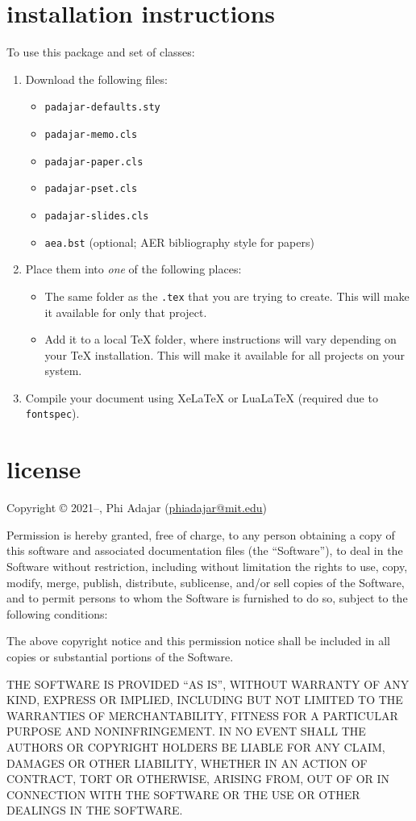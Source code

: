 \documentclass[11pt]{padajar-memo}
\begin{document}
\section{installation instructions}

To use this package and set of classes:

\begin{enumerate}
	\item Download the following files:
	\begin{itemize}
		\item \texttt{padajar-defaults.sty}
		\item \texttt{padajar-memo.cls}
		\item \texttt{padajar-paper.cls}
		\item \texttt{padajar-pset.cls}
		\item \texttt{padajar-slides.cls}
		\item \texttt{aea.bst} (optional; AER bibliography style for papers)
	\end{itemize}
	\item Place them into \textit{one} of the following places:
	\begin{itemize}
		\item The same folder as the \texttt{.tex} that you are trying to create. This will make it available for only that project.
		\item Add it to a local \TeX{} folder, where instructions will vary depending on your \TeX{} installation. This will make it available for all projects on your system.
	\end{itemize}
	\item Compile your document using XeLaTeX or LuaLaTeX (required due to \texttt{fontspec}).
\end{enumerate}

\section{license\label{license}}
Copyright \copyright{} 2021--\the\year{}, Phi Adajar (\href{mailto:phiadajar@mit.edu}{phiadajar@mit.edu})

Permission is hereby granted, free of charge, to any person obtaining a copy of this software and associated documentation files (the “Software”), to deal in the Software without restriction, including without limitation the rights to use, copy, modify, merge, publish, distribute, sublicense, and/or sell copies of the Software, and to permit persons to whom the Software is furnished to do so, subject to the following conditions:

The above copyright notice and this permission notice shall be included in all copies or substantial portions of the Software.

THE SOFTWARE IS PROVIDED “AS IS”, WITHOUT WARRANTY OF ANY KIND, EXPRESS OR IMPLIED, INCLUDING BUT NOT LIMITED TO THE WARRANTIES OF MERCHANTABILITY, FITNESS FOR A PARTICULAR PURPOSE AND NONINFRINGEMENT. IN NO EVENT SHALL THE AUTHORS OR COPYRIGHT HOLDERS BE LIABLE FOR ANY CLAIM, DAMAGES OR OTHER LIABILITY, WHETHER IN AN ACTION OF CONTRACT, TORT OR OTHERWISE, ARISING FROM, OUT OF OR IN CONNECTION WITH THE SOFTWARE OR THE USE OR OTHER DEALINGS IN THE SOFTWARE.
\end{document}
